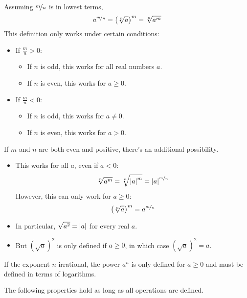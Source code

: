 Assuming $\nicefrac{m}{n}$ is in lowest terms,
\begin{equation*}
   a^{\nicefrac{m}{n}}
   = \left(\sqrt[n]{a}\right)^m
   = \sqrt[n]{a^m}
\end{equation*}
This definition only works under certain conditions:
\begin{itemize}
\item If $\frac{m}{n} > 0$:
 \begin{itemize}
 \item If $n$ is odd, this works for all real numbers $a$.
 \item If $n$ is even, this works for $a \geq 0$.
 \end{itemize}
\item If $\frac{m}{n} < 0$:
 \begin{itemize}
 \item If $n$ is odd, this works for $a \neq 0$.
 \item If $n$ is even, this works for $a > 0$.
 \end{itemize}
\end{itemize}

If $m$ and $n$ are both even and positive, there's an additional possibility.
\begin{itemize}
\item This works for all $a$, even if $a < 0$:
 \begin{equation*}
  \sqrt[n]{a^m} = \sqrt[n]{\left\lvert a\right\rvert^m} = \left\lvert a\right\rvert^{\nicefrac{m}{n}}
 \end{equation*}
 However, this can only work for $a \geq 0$:
 \begin{equation*}
  \left(\sqrt[n]{a}\right)^m = a^{\nicefrac{m}{n}}
 \end{equation*}
\item In particular, $\sqrt{a^2} = \left\lvert a\right\rvert$ for every real $a$.
\item But $(\sqrt{a})^2$ is only defined if $a \geq 0$, in which case $(\sqrt{a})^2 = a$.
\end{itemize}

If the exponent $n$ irrational, the power $a^n$ is only defined for $a \geq 0$ and must be defined in terms of logarithms.


The following properties hold as long as all operations are defined.

